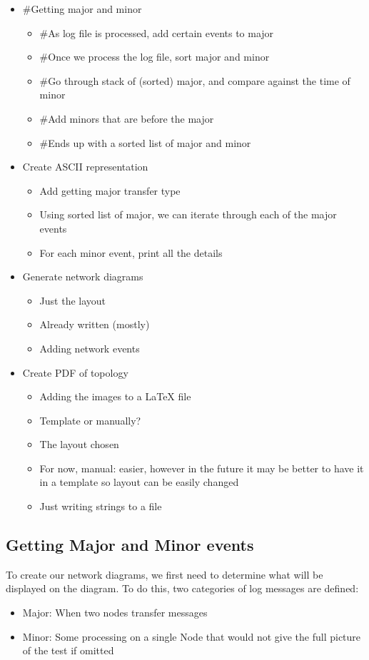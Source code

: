 \begin{itemize}
    \item \#Getting major and minor
    \begin{itemize}
        \item \#As log file is processed, add certain events to major
        \item \#Once we process the log file, sort major and minor
        \item \#Go through stack of (sorted) major, and compare against the time of minor
        \item \#Add minors that are before the major
        \item \#Ends up with a sorted list of major and minor
    \end{itemize}
    \item Create ASCII representation
    \begin{itemize}
        \item Add getting major transfer type
        \item Using sorted list of major, we can iterate through each of the major events
        \item For each minor event, print all the details
    \end{itemize}
    \item Generate network diagrams
    \begin{itemize}
        \item Just the layout
        \item Already written (mostly)
        \item Adding network events
    \end{itemize}
    \item Create PDF of topology
    \begin{itemize}
        \item Adding the images to a LaTeX file
        \item Template or manually?
        \item The layout chosen
        \item For now, manual: easier, however in the future it may be better to have it in a template so layout can be easily changed
        \item Just writing strings to a file
    \end{itemize}
\end{itemize}

\subsection{Getting Major and Minor events}
To create our network diagrams, we first need to determine what will be displayed on the diagram.
To do this, two categories of log messages are defined: 
\begin{itemize}
    \item Major: When two nodes transfer messages
    \item Minor: Some processing on a single Node that would not give the full picture of the test if omitted
\end{itemize}

